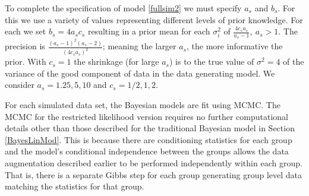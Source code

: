 \documentclass[12pt]{article}
\begin{document}
To complete the specification of model \eqref{fullsim2} we must specify $a_{s}$ and $b_{s}$. For this we use a variety of values representing different levels of prior knowledge. For each we set $b_{s} = 4a_{s}c_{s}$ resulting in a prior mean for each $\sigma^{2}_{i}$ of $\frac{4c_{s}a_{s}}{a_{s}-1}, \ a_{s} >1$. The precision is $\frac{(a_{s} -1)^{2}(a_{s}-2)}{(4c_{s}a_{s})^{2}}$; meaning the larger $a_{s}$, the more informative the prior. With $c_{s} = 1$ the shrinkage (for large $a_{s}$) is to the true value of $\sigma^{2} = 4$ of the variance of the good component of data in the data generating model. We consider $a_{s} = 1.25,  5, 10$ and $c_{s} = 1/2, 1, 2$. %

For each simulated data set, the Bayesian models are fit using MCMC. The MCMC for the restricted likelihood version requires no further computational details other than those described for the traditional Bayesian model in Section \ref{BayesLinMod}. This is because there are conditioning statistics for each group and the model's conditional independence between the groups allows the data augmentation described earlier to be performed independently within each group. That is, there is a separate Gibbs step for each group  generating group level data matching the statistics for that group. 
\end{document}
